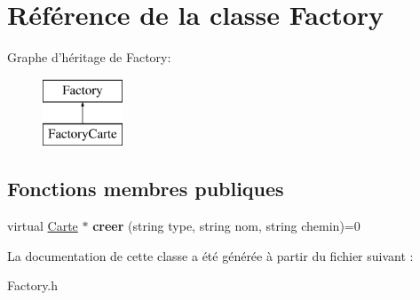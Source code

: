 \hypertarget{classFactory}{\section{\-Référence de la classe \-Factory}
\label{classFactory}
}
\-Graphe d'héritage de \-Factory\-:\begin{figure}[H]
\begin{center}
\leavevmode
\includegraphics[height=2.000000cm]{classFactory}
\end{center}
\end{figure}
\subsection*{\-Fonctions membres publiques}
\begin{DoxyCompactItemize}
\item 
\hypertarget{classFactory_abf45c3c8d63f070a1bb90865c9678197}{virtual \hyperlink{classCarte}{\-Carte} $\ast$ {\bfseries creer} (string type, string nom, string chemin)=0}\label{classFactory_abf45c3c8d63f070a1bb90865c9678197}

\end{DoxyCompactItemize}


\-La documentation de cette classe a été générée à partir du fichier suivant \-:\begin{DoxyCompactItemize}
\item 
\-Factory.\-h\end{DoxyCompactItemize}
